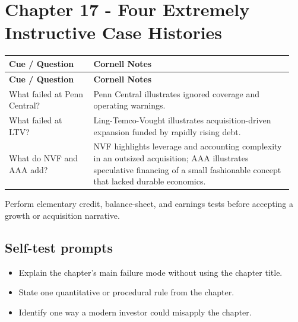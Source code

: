 \documentclass[11pt]{article}
\begin{document}
\section{Chapter 17 - Four Extremely Instructive Case Histories}
\begin{longtable}{@{}>{\raggedright\arraybackslash}p{0.29\linewidth}>{\raggedright\arraybackslash}p{0.66\linewidth}@{}}\toprule\textbf{Cue / Question} & \textbf{Cornell Notes}\\\midrule\endfirsthead\toprule\textbf{Cue / Question} & \textbf{Cornell Notes}\\\midrule\endhead
What failed at Penn Central? & Penn Central illustrates ignored coverage and operating warnings. \\
What failed at LTV? & Ling-Temco-Vought illustrates acquisition-driven expansion funded by rapidly rising debt. \\
What do NVF and AAA add? & NVF highlights leverage and accounting complexity in an outsized acquisition; AAA illustrates speculative financing of a small fashionable concept that lacked durable economics. \\
\bottomrule\end{longtable}
\begin{principlebox}Perform elementary credit, balance-sheet, and earnings tests before accepting a growth or acquisition narrative.\end{principlebox}
\subsection*{Self-test prompts}\begin{itemize}\item Explain the chapter's main failure mode without using the chapter title.\item State one quantitative or procedural rule from the chapter.\item Identify one way a modern investor could misapply the chapter.\end{itemize}
\end{document}
